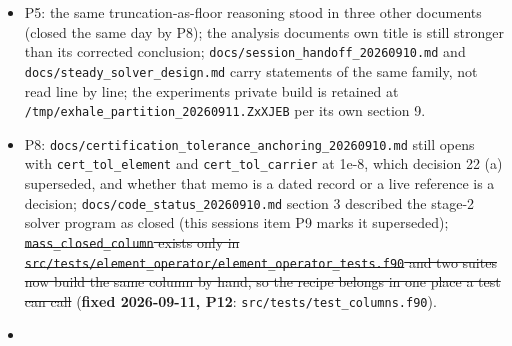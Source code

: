 \documentclass[english,a4paper]{my_memo}
\begin{document}
\begin{itemize}
  P4: the kind-generic rows do not form the equilibrium pressure term
  themselves (closed from \texttt{assemble\_residual}, but the two places must stay
  one expression if the kind-generic rows are ever made to write their own face data back);
  \st{the default path\textquotesingle s PLM momentum scale carries a coordinate artifact, the
  geometric pressure term \mbox{\texttt{(A+\ -\ A-)\ p\_j/dV}} entering the max separately
  although it is one physical term with the flux divergence, so at zero
  gravity with a uniform pressure the scale is \mbox{\texttt{2\ p/r}} where the physical
  force is zero (MEASURED: the well-balanced scale, which is the row\textquotesingle s true content,
  sits 0.944 below the base scheme\textquotesingle s for both Riemann solvers at every N;
  under WENO3 the two agree to 2E-13). Fixing it moves the default momentum
  measure at every cell and therefore the acceptance of every recorded
  state, so it is a user decision.} (\textbf{fixed 2026-09-11, P11}, on the
  user\textquotesingle s instruction: the scale is now the largest of the three physical
  terms, the zero-gravity artifact reads 2.22507E-308 in place of 1.000, and
  the acceptance movement is measured, \texttt{wasp\_full\_newton} still CERTIFIED.)
\item
  P5: the same truncation-as-floor reasoning stood in three other documents
  (closed the same day by P8); the analysis document\textquotesingle s own title is still
  stronger than its corrected conclusion; \texttt{docs/session\_handoff\_20260910.md}
  and \texttt{docs/steady\_solver\_design.md} carry statements of the same family,
  not read line by line; the experiment\textquotesingle s private build is retained at
  \texttt{/tmp/exhale\_partition\_20260911.ZxXJEB} per its own section 9.
\item
  P8: \texttt{docs/certification\_tolerance\_anchoring\_20260910.md} still opens with
  \texttt{cert\_tol\_element} and \texttt{cert\_tol\_carrier} at 1e-8, which decision 22 (a)
  superseded, and whether that memo is a dated record or a live reference is
  a decision; \texttt{docs/code\_status\_20260910.md} section 3 described the
  stage-2 solver program as closed (this session\textquotesingle s item P9 marks it
  superseded); \st{\mbox{\texttt{mass\_closed\_column}} exists only in
  \mbox{\texttt{src/tests/element\_operator/element\_operator\_tests.f90}} and two suites now
  build the same column by hand, so the recipe belongs in one place a test
  can call} (\textbf{fixed 2026-09-11, P12}: \texttt{src/tests/test\_columns.f90}).
\item

\end{itemize}
\end{document}
